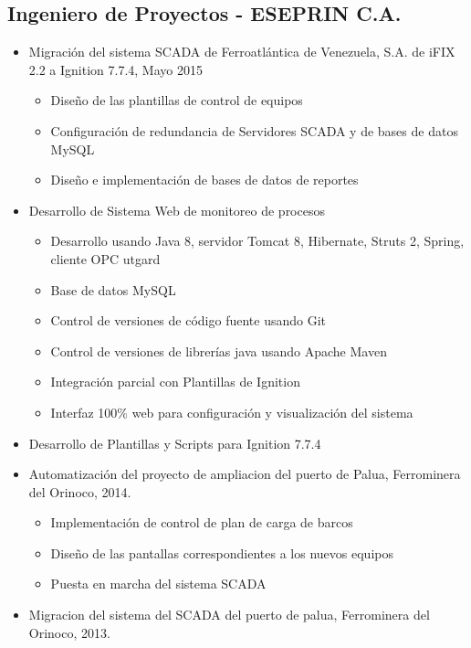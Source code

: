 \documentclass[letterpaper,11pt]{report}
\begin{document}
\subsection*{Ingeniero de Proyectos - ESEPRIN C.A.}
  \begin{itemize}
    \item Migración del sistema SCADA de Ferroatlántica de Venezuela, S.A. de iFIX 2.2 a Ignition 7.7.4, Mayo 2015
        \begin{itemize}
            \item Diseño de las plantillas de control de equipos
            \item Configuración de redundancia de Servidores SCADA y de bases de datos MySQL
            \item Diseño e implementación de bases de datos de reportes
        \end{itemize}
    \item Desarrollo de Sistema Web de monitoreo de procesos
        \begin{itemize}
        \item Desarrollo usando Java 8, servidor Tomcat 8, Hibernate, Struts 2, Spring, cliente OPC utgard
        \item Base de datos MySQL
        \item Control de versiones de código fuente usando Git
        \item Control de versiones de librerías java usando Apache Maven
        \item Integración parcial con Plantillas de Ignition
        \item Interfaz 100\% web para configuración y visualización del sistema
        \end{itemize}
    \item Desarrollo de Plantillas y Scripts para Ignition 7.7.4
    \item Automatización del proyecto de ampliacion del puerto de Palua, Ferrominera del Orinoco, 2014.
      \begin{itemize}
        \item Implementación de control de plan de carga de barcos
        \item Diseño de las pantallas correspondientes a los nuevos equipos
        \item Puesta en marcha del sistema SCADA
      \end{itemize}
    \item Migracion del sistema del SCADA del puerto de palua, Ferrominera del Orinoco, 2013.

\end{itemize}
\end{document}
